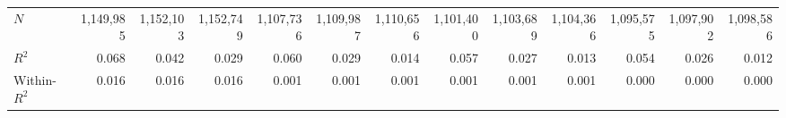 \begin{tabular}{lrrrrrrrrrrrr}
\midrule
$N$                                         &    1,149,985 &    1,152,103 &    1,152,749 &    1,107,736 &    1,109,987 &    1,110,656 &    1,101,400 &    1,103,689 &    1,104,366 &    1,095,575 &    1,097,902 &    1,098,586 \\ 
$R^2$                                       &        0.068 &        0.042 &        0.029 &        0.060 &        0.029 &        0.014 &        0.057 &        0.027 &        0.013 &        0.054 &        0.026 &        0.012 \\ 
Within-$R^2$                                &        0.016 &        0.016 &        0.016 &        0.001 &        0.001 &        0.001 &        0.001 &        0.001 &        0.001 &        0.000 &        0.000 &        0.000 \\ 
\bottomrule
\end{tabular}
